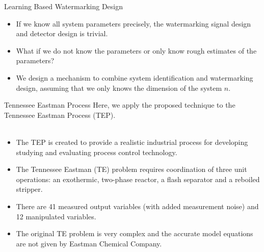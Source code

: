 \documentclass[10pt]{beamer}
\begin{document}
  \begin{frame}{Learning Based Watermarking Design}
    \begin{itemize}
    \item If we know all system parameters precisely, the watermarking signal design and detector design is trivial.
    \item What if we do not know the parameters or only know rough estimates of the parameters?
    \item We design a mechanism to combine system identification and watermarking design, assuming that we only knows the dimension of the system $n$.
    \end{itemize}
  \end{frame}

  \begin{frame}{Tennessee Eastman Process}
    Here, we apply the proposed technique to the Tennessee Eastman Process (TEP).\\~\\
    \begin{itemize}
    \item The TEP is created to provide a realistic industrial process for developing studying and evaluating process control technology. 
    \item The Tennessee Eastman (TE) problem requires coordination of three unit operations: an exothermic, two-phase reactor, a flash separator and a reboiled  stripper.
    \item There are 41 measured output variables (with added measurement noise) and 12 manipulated variables.
    \item The original TE problem is very complex and the accurate model equations are not given by Eastman Chemical Company.   
    \end{itemize}
  \end{frame}
\end{document}
